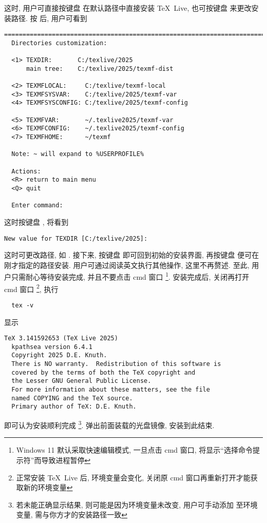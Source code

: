 这时, 用户可直接按键盘  在默认路径中直接安装 \TeX~Live,
也可按键盘  来更改安装路径.
按  后, 用户可看到
\begin{lstlisting}[language = {}]
  ==============================================================================
  Directories customization:
  
  <1> TEXDIR:       C:/texlive/2025
      main tree:    C:/texlive/2025/texmf-dist
  
  <2> TEXMFLOCAL:     C:/texlive/texmf-local
  <3> TEXMFSYSVAR:    C:/texlive/2025/texmf-var
  <4> TEXMFSYSCONFIG: C:/texlive/2025/texmf-config
  
  <5> TEXMFVAR:       ~/.texlive2025/texmf-var
  <6> TEXMFCONFIG:    ~/.texlive2025/texmf-config
  <7> TEXMFHOME:      ~/texmf
  
  Note: ~ will expand to %USERPROFILE%
  
  Actions:
  <R> return to main menu
  <Q> quit
  
  Enter command:
\end{lstlisting}
这时按键盘 , 将看到
\begin{lstlisting}[language = {}]
  New value for TEXDIR [C:/texlive/2025]:
\end{lstlisting}
这时可更改路径, 如 .
接下来, 按键盘  即可回到初始的安装界面,
再按键盘  便可在刚才指定的路径安装.
用户可通过阅读英文执行其他操作, 这里不再赘述.
至此, 用户只需耐心等待安装完成, 并且不要点击 \textsf{cmd} 窗口%
\footnote{Windows 11 默认采取快速编辑模式, 一旦点击 \textsf{cmd} 窗口,
将显示``选择命令提示符''而导致进程暂停}.
安装完成后, 关闭再打开 \textsf{cmd} 窗口%
\footnote{正常安装 \TeX~Live 后, 环境变量会变化,
关闭原 \textsf{cmd} 窗口再重新打开才能获取新的环境变量},
执行
\begin{lstlisting}
  tex -v
\end{lstlisting}
显示
\begin{lstlisting}[language = {}]
  TeX 3.141592653 (TeX Live 2025)
  kpathsea version 6.4.1
  Copyright 2025 D.E. Knuth.
  There is NO warranty.  Redistribution of this software is
  covered by the terms of both the TeX copyright and
  the Lesser GNU General Public License.
  For more information about these matters, see the file
  named COPYING and the TeX source.
  Primary author of TeX: D.E. Knuth.
\end{lstlisting}
即可认为安装顺利完成%
\footnote{若未能正确显示结果, 则可能是因为环境变量未改变,
用户可手动添加  至环境变量,
 需与你方才的安装路径一致}.
弹出前面装载的光盘镜像,
安装到此结束.

